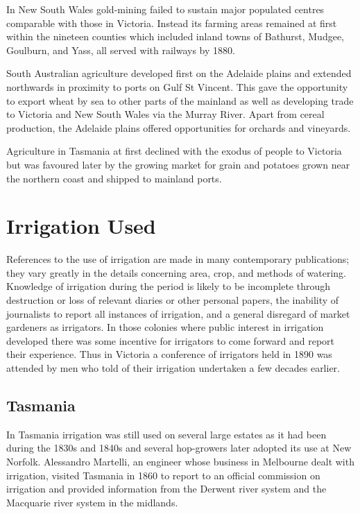 In New South Wales  gold-mining failed to
sustain major populated centres comparable with those in Victoria.
Instead its farming areas remained at first within the nineteen
counties which included inland towns of Bathurst,  Mudgee,  Goulburn,  and
Yass,  all served with
railways by 1880.

South Australian  agriculture developed first
on the Adelaide plains and extended northwards in proximity to ports
on Gulf St Vincent.  This gave the opportunity to export
wheat by sea to other parts of the mainland as well as
developing trade to Victoria and New South Wales via the Murray
River.  Apart from cereal
production, the Adelaide plains offered opportunities for
orchards and vineyards.

Agriculture in Tasmania  at first declined with the
exodus of people to Victoria but was favoured later by the growing
market for grain and potatoes grown near the northern coast and
shipped to mainland ports.

\section*{Irrigation Used}

References to the use of irrigation are made in many contemporary
publications; they vary greatly in the details concerning area, crop,
and methods of watering.  Knowledge of irrigation during the period is
likely to be incomplete through destruction or loss of relevant
diaries or other personal papers, the inability of journalists to
report all instances of irrigation, and a general disregard of market
gardeners as irrigators.  In those colonies where public interest in
irrigation developed there was some incentive for irrigators to come
forward and report their experience.  Thus in Victoria a conference of
irrigators held in 1890 was attended by men who told of their
irrigation undertaken a few decades earlier.

\subsection*{Tasmania}

In Tasmania irrigation was still used on several large estates as it
had been during the 1830s and 1840s and several hop-growers later
adopted its use at New Norfolk.  Alessandro
Martelli,  an engineer whose business in Melbourne
dealt with irrigation, visited Tasmania in 1860 to report to an
official commission on irrigation and provided information from the
Derwent river  system and the Macquarie river
 system in the midlands.

